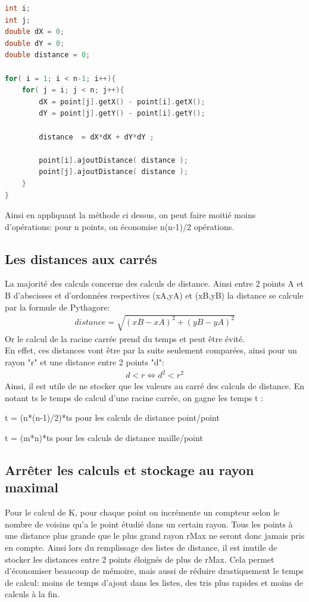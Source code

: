 \documentclass[stage2a]{tnreport}
\begin{document}
\begin{lstlisting}[language=C++, caption={Remplissage des listes de distance}, label={lst:distances}]
int i;
int j;
double dX = 0;
double dY = 0;
double distance = 0;

for( i = 1; i < n-1; i++){
    for( j = i; j < n; j++){
        dX = point[j].getX() - point[i].getX();
		dY = point[j].getY() - point[i].getY();

 		distance  = dX*dX + dY*dY ;
 		
 		point[i].ajoutDistance( distance );
        point[j].ajoutDistance( distance );
    }
}
\end{lstlisting}

Ainsi en appliquant la méthode ci dessus, on peut faire moitié moins d'opérations: pour n points, on économise n(n-1)/2 opérations.

\subsection{Les distances aux carrés}

La majorité des calculs concerne des calculs de distance. Ainsi entre 2 points A et B d'abscisses et d'ordonnées respectives (xA,yA) et (xB,yB) la distance se calcule par la formule de Pythagore:
\begin{align*}
distance = \sqrt{(xB-xA)^2 + (yB-yA)^2}
\end{align*}
Or le calcul de la racine carrée prend du temps et peut être évité.\\

En effet, ces distances vont être par la suite seulement comparées, ainsi pour un rayon "r" et une distance entre 2 points "d":
\begin{align*}
d < r  \Leftrightarrow  d^2 < r^2
\end{align*}
Ainsi, il est utile de ne stocker que les valeurs au carré des calculs de distance. En notant ts le temps de calcul d'une racine carrée, on gagne les temps t :

\hspace*{1cm} t = (n*(n-1)/2)*ts \hspace*{1cm} pour les calculs de distance point/point

\hspace*{1cm} t = (m*n)*ts \hspace*{1cm} pour les calculs de distance maille/point\\

\subsection{Arrêter les calculs et stockage au rayon maximal}
Pour le calcul de K, pour chaque point on incrémente un compteur selon le nombre de voisins qu'a le point étudié dans un certain rayon. Tous les points à une distance plus grande que le plus grand rayon rMax ne seront donc jamais pris en compte. Ainsi lors du remplissage des listes de distance, il est inutile de stocker les distances entre 2 points éloignés de plus de rMax. Cela permet d'économiser beaucoup de mémoire, mais aussi de réduire drastiquement le temps de calcul:  moins de temps d'ajout dans les listes, des tris plus rapides et moins de calculs à la fin.
\end{document}

